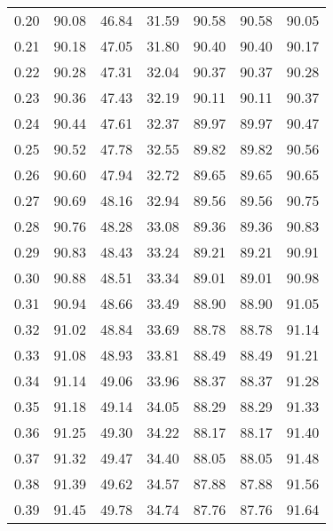 \begin{tabular}{|c|c|c|c|c|c|c|}
      0.20 &     90.08 &     46.84 &      31.59 &   90.58 &      90.58 &         90.05 \\
      0.21 &     90.18 &     47.05 &      31.80 &   90.40 &      90.40 &         90.17 \\
      0.22 &     90.28 &     47.31 &      32.04 &   90.37 &      90.37 &         90.28 \\
      0.23 &     90.36 &     47.43 &      32.19 &   90.11 &      90.11 &         90.37 \\
      0.24 &     90.44 &     47.61 &      32.37 &   89.97 &      89.97 &         90.47 \\
      0.25 &     90.52 &     47.78 &      32.55 &   89.82 &      89.82 &         90.56 \\
      0.26 &     90.60 &     47.94 &      32.72 &   89.65 &      89.65 &         90.65 \\
      0.27 &     90.69 &     48.16 &      32.94 &   89.56 &      89.56 &         90.75 \\
      0.28 &     90.76 &     48.28 &      33.08 &   89.36 &      89.36 &         90.83 \\
      0.29 &     90.83 &     48.43 &      33.24 &   89.21 &      89.21 &         90.91 \\
      0.30 &     90.88 &     48.51 &      33.34 &   89.01 &      89.01 &         90.98 \\
      0.31 &     90.94 &     48.66 &      33.49 &   88.90 &      88.90 &         91.05 \\
      0.32 &     91.02 &     48.84 &      33.69 &   88.78 &      88.78 &         91.14 \\
      0.33 &     91.08 &     48.93 &      33.81 &   88.49 &      88.49 &         91.21 \\
      0.34 &     91.14 &     49.06 &      33.96 &   88.37 &      88.37 &         91.28 \\
      0.35 &     91.18 &     49.14 &      34.05 &   88.29 &      88.29 &         91.33 \\
      0.36 &     91.25 &     49.30 &      34.22 &   88.17 &      88.17 &         91.40 \\
      0.37 &     91.32 &     49.47 &      34.40 &   88.05 &      88.05 &         91.48 \\
      0.38 &     91.39 &     49.62 &      34.57 &   87.88 &      87.88 &         91.56 \\
      0.39 &     91.45 &     49.78 &      34.74 &   87.76 &      87.76 &         91.64 \\

\end{tabular}
